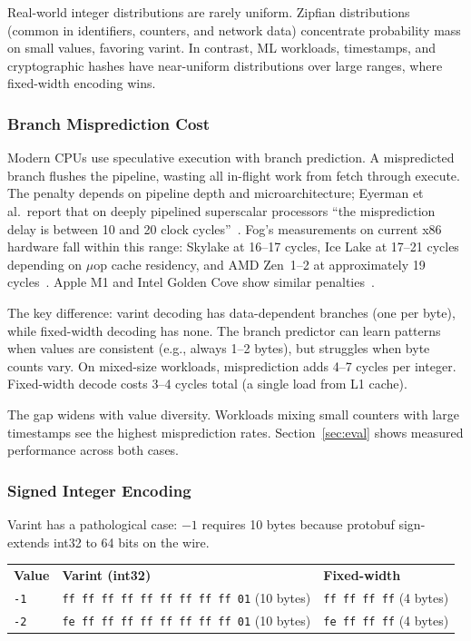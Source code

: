 \documentclass[10pt,onecolumn]{article}
\begin{document}
Real-world integer distributions are rarely uniform. Zipfian distributions (common in identifiers, counters, and network data) concentrate probability mass on small values, favoring varint. In contrast, ML workloads, timestamps, and cryptographic hashes have near-uniform distributions over large ranges, where fixed-width encoding wins.

\subsubsection{Branch Misprediction Cost}

Modern CPUs use speculative execution with branch prediction. A mispredicted branch flushes the pipeline, wasting all in-flight work from fetch through execute. The penalty depends on pipeline depth and microarchitecture; Eyerman et al.\ report that on deeply pipelined superscalar processors ``the misprediction delay is between 10 and 20 clock cycles''~\cite{eyerman-branch}. Fog's measurements on current x86 hardware fall within this range: Skylake at 16--17 cycles, Ice Lake at 17--21 cycles depending on $\mu$op cache residency, and AMD Zen~1--2 at approximately 19 cycles~\cite{fog-microarch}. Apple M1 and Intel Golden Cove show similar penalties~\cite{m1-bench, golden-cove}.

The key difference: varint decoding has data-dependent branches (one per byte), while fixed-width decoding has none. The branch predictor can learn patterns when values are consistent (e.g., always 1--2 bytes), but struggles when byte counts vary. On mixed-size workloads, misprediction adds 4--7 cycles per integer. Fixed-width decode costs 3--4 cycles total (a single load from L1 cache).

The gap widens with value diversity. Workloads mixing small counters with large timestamps see the highest misprediction rates. Section~\ref{sec:eval} shows measured performance across both cases.

\subsubsection{Signed Integer Encoding}

Varint has a pathological case: $-1$ requires 10 bytes because protobuf sign-extends int32 to 64 bits on the wire.

\vspace{6pt}
\begin{center}
\small
\begin{tabular}{@{}lll@{}}
\textbf{Value} & \textbf{Varint (int32)} & \textbf{Fixed-width} \\[4pt]
\texttt{-1} & \texttt{ff ff ff ff ff ff ff ff ff 01} (10 bytes) & \texttt{ff ff ff ff} (4 bytes) \\
\texttt{-2} & \texttt{fe ff ff ff ff ff ff ff ff 01} (10 bytes) & \texttt{fe ff ff ff} (4 bytes) \\
\end{tabular}
\end{center}
\vspace{6pt}
\end{document}

